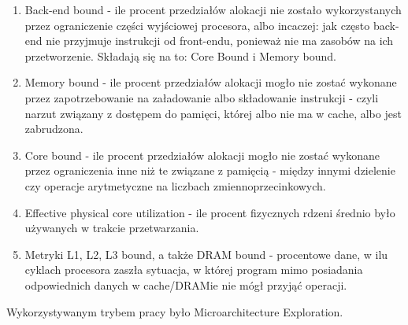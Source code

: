 \documentclass[12pt]{article}
\begin{document}
\begin{enumerate}
\begin{enumerate}
		\item Back-end bound - ile procent przedziałów alokacji nie zostało wykorzystanych przez ograniczenie części wyjściowej procesora, albo incaczej: jak często back-end nie przyjmuje instrukcji od front-endu, ponieważ nie ma zasobów na ich przetworzenie. Składają się na to: Core Bound i Memory bound.
		\item Memory bound - ile procent przedziałów alokacji mogło nie zostać wykonane przez zapotrzebowanie na załadowanie albo składowanie instrukcji - czyli narzut związany z dostępem do pamięci, której albo nie ma w cache, albo jest zabrudzona.
		\item Core bound - ile procent przedziałów alokacji mogło nie zostać wykonane przez ograniczenia inne niż te związane z pamięcią - między innymi dzielenie czy operacje arytmetyczne na liczbach zmiennoprzecinkowych.
		\item Effective physical core utilization - ile procent fizycznych rdzeni średnio było używanych w trakcie przetwarzania.
		\item Metryki L1, L2, L3 bound, a także DRAM bound - procentowe dane, w ilu cyklach procesora zaszła sytuacja, w której program mimo posiadania odpowiednich danych w cache/DRAMie nie mógł przyjąć operacji.
	\end{enumerate}
	Wykorzystywanym trybem pracy było Microarchitecture Exploration.
\end{enumerate}
\end{document}
